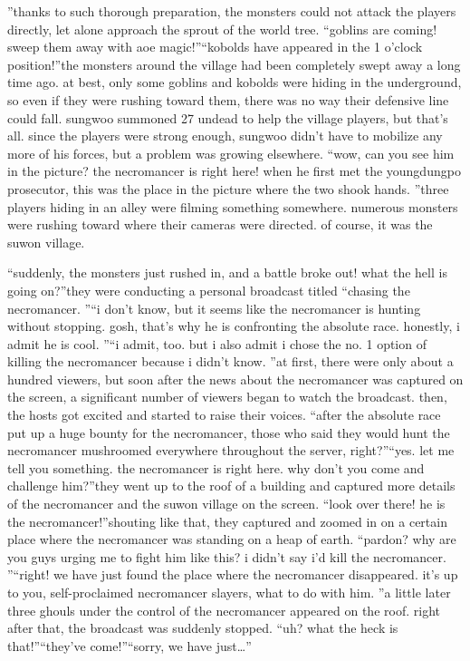 ”thanks to such thorough preparation, the monsters could not attack the players directly, let alone approach the sprout of the world tree.
“goblins are coming! sweep them away with aoe magic!”“kobolds have appeared in the 1 o’clock position!”the monsters around the village had been completely swept away a long time ago.
at best, only some goblins and kobolds were hiding in the underground, so even if they were rushing toward them, there was no way their defensive line could fall.
sungwoo summoned 27 undead to help the village players, but that’s all.
 since the players were strong enough, sungwoo didn’t have to mobilize any more of his forces, but a problem was growing elsewhere.
“wow, can you see him in the picture? the necromancer is right here! when he first met the youngdungpo prosecutor, this was the place in the picture where the two shook hands.
”three players hiding in an alley were filming something somewhere.
 numerous monsters were rushing toward where their cameras were directed.
 of course, it was the suwon village.


“suddenly, the monsters just rushed in, and a battle broke out! what the hell is going on?”they were conducting a personal broadcast titled “chasing the necromancer.
”“i don’t know, but it seems like the necromancer is hunting without stopping.
 gosh, that’s why he is confronting the absolute race.
 honestly, i admit he is cool.
”“i admit, too.
 but i also admit i chose the no.
 1 option of killing the necromancer because i didn’t know.
”at first, there were only about a hundred viewers, but soon after the news about the necromancer was captured on the screen, a significant number of viewers began to watch the broadcast.
then, the hosts got excited and started to raise their voices.
“after the absolute race put up a huge bounty for the necromancer, those who said they would hunt the necromancer mushroomed everywhere throughout the server, right?”“yes.
 let me tell you something.
 the necromancer is right here.
 why don’t you come and challenge him?”they went up to the roof of a building and captured more details of the necromancer and the suwon village on the screen.
“look over there! he is the necromancer!”shouting like that, they captured and zoomed in on a certain place where the necromancer was standing on a heap of earth.
“pardon? why are you guys urging me to fight him like this? i didn’t say i’d kill the necromancer.
”“right! we have just found the place where the necromancer disappeared.
 it’s up to you, self-proclaimed necromancer slayers, what to do with him.
”a little later three ghouls under the control of the necromancer appeared on the roof.
right after that, the broadcast was suddenly stopped.
“uh? what the heck is that!”“they’ve come!”“sorry, we have just…”

 